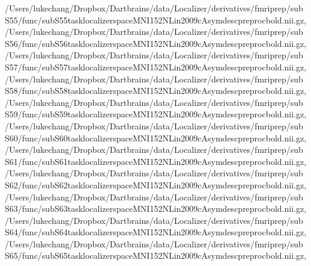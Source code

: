 \documentclass[letterpaper,10pt,english]{sphinxmanual}
\begin{document}
\begin{sphinxVerbatim}[commandchars=\\\{\}]
 \PYGZsq{}/Users/lukechang/Dropbox/Dartbrains/data/Localizer/derivatives/fmriprep/sub\PYGZhy{}S55/func/sub\PYGZhy{}S55\PYGZus{}task\PYGZhy{}localizer\PYGZus{}space\PYGZhy{}MNI152NLin2009cAsym\PYGZus{}desc\PYGZhy{}preproc\PYGZus{}bold.nii.gz\PYGZsq{},
 \PYGZsq{}/Users/lukechang/Dropbox/Dartbrains/data/Localizer/derivatives/fmriprep/sub\PYGZhy{}S56/func/sub\PYGZhy{}S56\PYGZus{}task\PYGZhy{}localizer\PYGZus{}space\PYGZhy{}MNI152NLin2009cAsym\PYGZus{}desc\PYGZhy{}preproc\PYGZus{}bold.nii.gz\PYGZsq{},
 \PYGZsq{}/Users/lukechang/Dropbox/Dartbrains/data/Localizer/derivatives/fmriprep/sub\PYGZhy{}S57/func/sub\PYGZhy{}S57\PYGZus{}task\PYGZhy{}localizer\PYGZus{}space\PYGZhy{}MNI152NLin2009cAsym\PYGZus{}desc\PYGZhy{}preproc\PYGZus{}bold.nii.gz\PYGZsq{},
 \PYGZsq{}/Users/lukechang/Dropbox/Dartbrains/data/Localizer/derivatives/fmriprep/sub\PYGZhy{}S58/func/sub\PYGZhy{}S58\PYGZus{}task\PYGZhy{}localizer\PYGZus{}space\PYGZhy{}MNI152NLin2009cAsym\PYGZus{}desc\PYGZhy{}preproc\PYGZus{}bold.nii.gz\PYGZsq{},
 \PYGZsq{}/Users/lukechang/Dropbox/Dartbrains/data/Localizer/derivatives/fmriprep/sub\PYGZhy{}S59/func/sub\PYGZhy{}S59\PYGZus{}task\PYGZhy{}localizer\PYGZus{}space\PYGZhy{}MNI152NLin2009cAsym\PYGZus{}desc\PYGZhy{}preproc\PYGZus{}bold.nii.gz\PYGZsq{},
 \PYGZsq{}/Users/lukechang/Dropbox/Dartbrains/data/Localizer/derivatives/fmriprep/sub\PYGZhy{}S60/func/sub\PYGZhy{}S60\PYGZus{}task\PYGZhy{}localizer\PYGZus{}space\PYGZhy{}MNI152NLin2009cAsym\PYGZus{}desc\PYGZhy{}preproc\PYGZus{}bold.nii.gz\PYGZsq{},
 \PYGZsq{}/Users/lukechang/Dropbox/Dartbrains/data/Localizer/derivatives/fmriprep/sub\PYGZhy{}S61/func/sub\PYGZhy{}S61\PYGZus{}task\PYGZhy{}localizer\PYGZus{}space\PYGZhy{}MNI152NLin2009cAsym\PYGZus{}desc\PYGZhy{}preproc\PYGZus{}bold.nii.gz\PYGZsq{},
 \PYGZsq{}/Users/lukechang/Dropbox/Dartbrains/data/Localizer/derivatives/fmriprep/sub\PYGZhy{}S62/func/sub\PYGZhy{}S62\PYGZus{}task\PYGZhy{}localizer\PYGZus{}space\PYGZhy{}MNI152NLin2009cAsym\PYGZus{}desc\PYGZhy{}preproc\PYGZus{}bold.nii.gz\PYGZsq{},
 \PYGZsq{}/Users/lukechang/Dropbox/Dartbrains/data/Localizer/derivatives/fmriprep/sub\PYGZhy{}S63/func/sub\PYGZhy{}S63\PYGZus{}task\PYGZhy{}localizer\PYGZus{}space\PYGZhy{}MNI152NLin2009cAsym\PYGZus{}desc\PYGZhy{}preproc\PYGZus{}bold.nii.gz\PYGZsq{},
 \PYGZsq{}/Users/lukechang/Dropbox/Dartbrains/data/Localizer/derivatives/fmriprep/sub\PYGZhy{}S64/func/sub\PYGZhy{}S64\PYGZus{}task\PYGZhy{}localizer\PYGZus{}space\PYGZhy{}MNI152NLin2009cAsym\PYGZus{}desc\PYGZhy{}preproc\PYGZus{}bold.nii.gz\PYGZsq{},
 \PYGZsq{}/Users/lukechang/Dropbox/Dartbrains/data/Localizer/derivatives/fmriprep/sub\PYGZhy{}S65/func/sub\PYGZhy{}S65\PYGZus{}task\PYGZhy{}localizer\PYGZus{}space\PYGZhy{}MNI152NLin2009cAsym\PYGZus{}desc\PYGZhy{}preproc\PYGZus{}bold.nii.gz\PYGZsq{},

\end{sphinxVerbatim}
\end{document}

